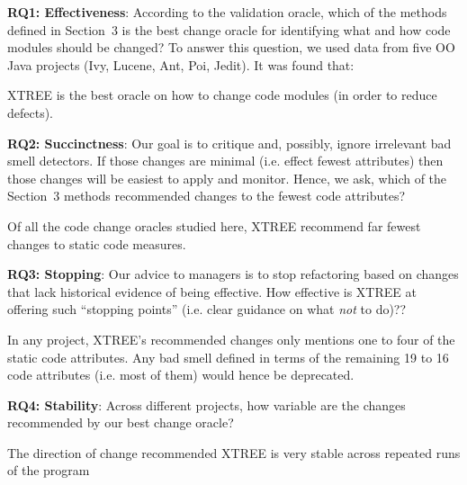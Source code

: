 \documentclass[twocolumn,5p]{elsarticle}
\theoremstyle{break}
\begin{document}
 {\bf  RQ1: Effectiveness}: According to the validation oracle, which of the methods  defined in Section~3 is the best  change oracle for identifying what and how
  code modules should be changed? To answer this question, we used data from five OO Java projects
  (Ivy, Lucene, Ant, Poi, Jedit). It was found that:
  \begin{lesson}
 XTREE is the best oracle on how to change code modules (in order to reduce defects).
  \end{lesson}

 {\bf RQ2: Succinctness}: Our goal is to critique and, possibly,
ignore irrelevant bad smell detectors.  If those changes are minimal (i.e. effect fewest attributes) then those changes
will be easiest to apply and monitor. Hence, we ask, which of the Section~3 methods recommended changes to the fewest
code attributes?
\begin{lesson}
Of all the code change oracles studied here, XTREE recommend  far fewest changes to static code measures.
\end{lesson}

 {\bf RQ3: Stopping}: Our advice to managers is to stop refactoring based on changes that lack
historical evidence of being effective. How effective is XTREE at offering such ``stopping points'' (i.e. clear guidance on what {\em not} to do)??
\begin{lesson}
In  any  project,  XTREE’s  recommended  changes  only  mentions one to four 
of the  static code attributes.  Any bad smell defined in terms of the remaining 19 to 16 code attributes (i.e. most of them)
would hence be deprecated.
\end{lesson}

 {\bf RQ4: Stability}: Across different projects, how variable are the changes recommended by our best change oracle?
\begin{lesson}
The direction of change recommended  XTREE is  very stable across repeated runs of the program 
\end{lesson} 
\end{document}
